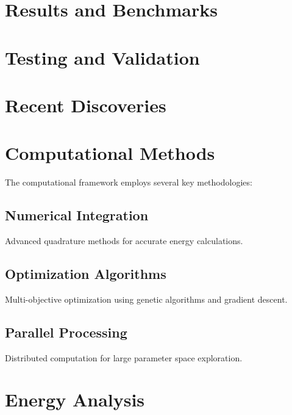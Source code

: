 \documentclass{article}
\begin{document}



\section{Results and Benchmarks}




\section{Testing and Validation}




\section{Recent Discoveries}



\section{Computational Methods}

The computational framework employs several key methodologies:

\subsection{Numerical Integration}
Advanced quadrature methods for accurate energy calculations.

\subsection{Optimization Algorithms}
Multi-objective optimization using genetic algorithms and gradient descent.

\subsection{Parallel Processing}
Distributed computation for large parameter space exploration.

\section{Energy Analysis}
\end{document}
